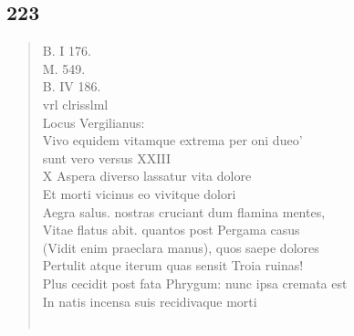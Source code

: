 \documentclass[11pt, a4paper]{report}
\begin{document}
            \subsection*{223}
      \begin{verse}
      B. I 176. \\ M. 549. \\ B. IV 186. \\ vrl clrisslml \\ Locus Vergilianus: \\ Vivo equidem vitamque extrema per oni dueo’ \\  \lbrack sunt vero \rbrack  versus XXIII \\ X Aspera diverso lassatur vita dolore \\ Et morti vicinus eo vivitque dolori \\ Aegra salus. nostras cruciant dum flamina mentes, \\ Vitae flatus abit. quantos post Pergama casus \\ (Vidit enim praeclara manus), quos saepe dolores \\ Pertulit atque iterum quas sensit Troia ruinas! \\ Plus cecidit post fata Phrygum: nunc ipsa cremata est \\ In natis incensa suis recidivaque morti \\ 
        ﻿\pagebreak 

\end{verse}
\end{document}
